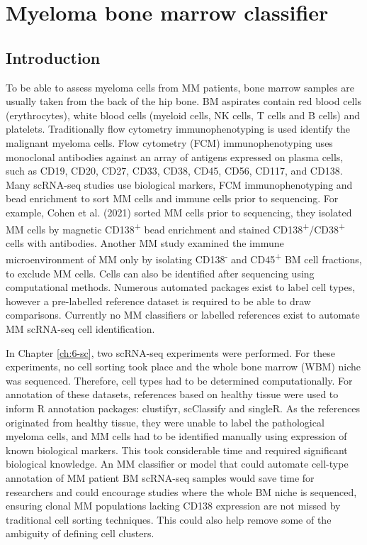 \section{Myeloma bone marrow classifier}\label{sec:MM_classifier}
\subsection{Introduction}
To be able to assess myeloma cells from MM patients, bone marrow samples are usually taken from the back of the hip bone.
BM aspirates contain red blood cells (erythrocytes), white blood cells (myeloid cells, NK cells, T cells and B cells) and platelets.
Traditionally flow cytometry immunophenotyping is used identify the malignant myeloma cells.
Flow cytometry (FCM) immunophenotyping uses monoclonal antibodies against an array of antigens expressed on plasma cells, such as CD19, CD20, CD27, CD33, CD38, CD45, CD56, CD117, and CD138\cite{jeong2012simplified}.
Many scRNA-seq studies use biological markers, FCM immunophenotyping and bead enrichment to sort MM cells and immune cells prior to sequencing.
For example, Cohen et al. (2021) sorted MM cells prior to sequencing, they isolated MM cells by magnetic CD138\textsuperscript{+} bead enrichment and stained CD138\textsuperscript{+}/CD38\textsuperscript{+} cells with antibodies\cite{cohen2021identification}.
Another MM study examined the immune microenvironment of MM only by isolating CD138\textsuperscript{-} and CD45\textsuperscript{+} BM cell fractions, to exclude MM cells\cite{zavidij2020single}.
Cells can also be identified after sequencing using computational methods.
Numerous automated packages exist to label cell types, however a pre-labelled reference dataset is required to be able to draw comparisons.
Currently no MM classifiers or labelled references exist to automate MM scRNA-seq cell identification.

In Chapter \ref{ch:6-sc}, two scRNA-seq experiments were performed.
For these experiments, no cell sorting took place and the whole bone marrow (WBM) niche was sequenced.
Therefore, cell types had to be determined computationally.
For annotation of these datasets, references based on healthy tissue were used to inform R annotation packages: clustifyr, scClassify and singleR.
As the references originated from healthy tissue, they were unable to label the pathological myeloma cells, and MM cells had to be identified manually using expression of known biological markers.
This took considerable time and required significant biological knowledge.
An MM classifier or model that could automate cell-type annotation of MM patient BM scRNA-seq samples would save time for researchers and could encourage studies where the whole BM niche is sequenced, ensuring clonal MM populations lacking CD138 expression are not missed by traditional cell sorting techniques.
This could also help remove some of the ambiguity of defining cell clusters.

